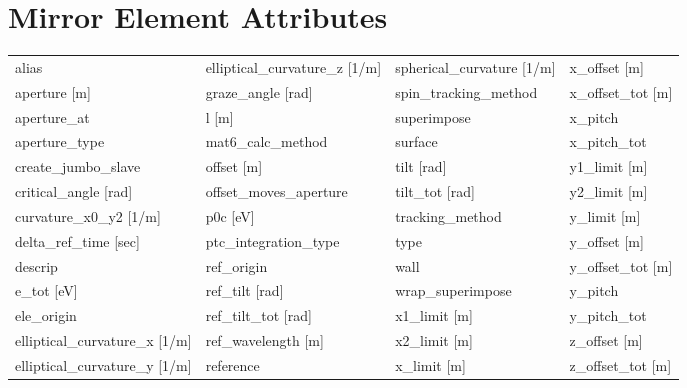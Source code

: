  \vfill
 
 \section{Mirror Element Attributes}
 \label{s:list.mirror}
 
 \begin{tabular}{llll} \toprule
alias                            & elliptical_curvature_z [1/m]     & spherical_curvature [1/m]        & x_offset [m]                     \\
aperture [m]                     & graze_angle [rad]                & spin_tracking_method             & x_offset_tot [m]                 \\
aperture_at                      & l [m]                            & superimpose                      & x_pitch                          \\
aperture_type                    & mat6_calc_method                 & surface                          & x_pitch_tot                      \\
create_jumbo_slave               & offset [m]                       & tilt [rad]                       & y1_limit [m]                     \\
critical_angle [rad]             & offset_moves_aperture            & tilt_tot [rad]                   & y2_limit [m]                     \\
curvature_x0_y2 [1/m]            & p0c [eV]                         & tracking_method                  & y_limit [m]                      \\
delta_ref_time [sec]             & ptc_integration_type             & type                             & y_offset [m]                     \\
descrip                          & ref_origin                       & wall                             & y_offset_tot [m]                 \\
e_tot [eV]                       & ref_tilt [rad]                   & wrap_superimpose                 & y_pitch                          \\
ele_origin                       & ref_tilt_tot [rad]               & x1_limit [m]                     & y_pitch_tot                      \\
elliptical_curvature_x [1/m]     & ref_wavelength [m]               & x2_limit [m]                     & z_offset [m]                     \\
elliptical_curvature_y [1/m]     & reference                        & x_limit [m]                      & z_offset_tot [m]                 \\
 \bottomrule
 \end{tabular}
 \vfill
 
